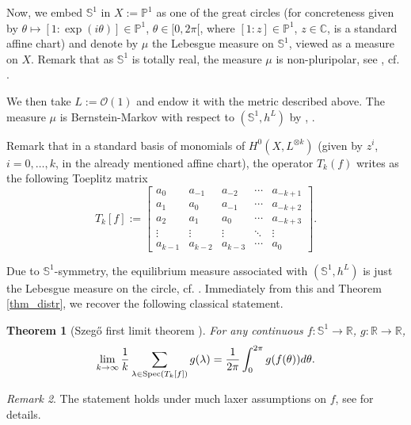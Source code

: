 \documentclass[12pt]{article}
\numberwithin{equation}{section}
\theoremstyle{theorem}
\newtheorem{thm}{Theorem}[section]
\theoremstyle{definition}
\theoremstyle{remark}
\newtheorem{rem}[thm]{Remark}
\newcommand{\comp}{\mathbb{C}}
\newcommand{\real}{\mathbb{R}}
\begin{document}
	Now, we embed $\mathbb{S}^1$ in $X := \mathbb{P}^1$ as one of the great circles (for concreteness given by $\theta \mapsto [1: \exp(i \theta)] \in \mathbb{P}^1$, $\theta \in [0, 2 \pi[$, where $[1 : z] \in \mathbb{P}^1$, $z \in \comp$, is a standard affine chart) and denote by $\mu$ the Lebesgue measure on $\mathbb{S}^1$, viewed as a measure on $X$.
	Remark that as $\mathbb{S}^1$ is totally real, the measure $\mu$ is non-pluripolar, see \cite{SadullaevReal}, cf. \cite[Exercise 4.39.5]{GuedjZeriahBook}. 
	\par 
	We then take $L := \mathscr{O}(1)$ and endow it with the metric described above.
	The measure $\mu$ is Bernstein-Markov with respect to $(\mathbb{S}^1, h^L)$ by \cite[Corollary 1.8]{BerBoucNys}, \cite[Proposition 3.6]{BernsteinMarkovSurvey}.
	\par 
	Remark that in a standard basis of monomials of $H^0(X, L^{\otimes k})$ (given by $z^i$, $i = 0, \ldots, k$, in the already mentioned affine chart), the operator $T_k(f)$ writes as the following Toeplitz matrix 
	\begin{equation}
		T_k[f]
		:=
		\begin{bmatrix}
		a_0 & a_{-1} & a_{-2} & \cdots & a_{-k + 1} \\
		a_1 & a_0 & a_{-1} & \cdots & a_{-k+2} \\
		a_2 & a_1 & a_0 & \cdots & a_{-k+3} \\
		\vdots & \vdots & \vdots & \ddots & \vdots \\
		a_{k - 1} & a_{k-2} & a_{k-3} & \cdots & a_0
		\end{bmatrix}.
	\end{equation}
	\par 
	Due to $\mathbb{S}^1$-symmetry, the equilibrium measure associated with $(\mathbb{S}^1, h^L)$ is just the Lebesgue measure on the circle, cf. \cite[Exercise 9.8]{GuedjZeriahBook}.
	Immediately from this and Theorem \ref{thm_distr}, we recover the following classical statement.
	\begin{thm}[{Szegő first limit theorem \cite{SzegoFST}}]
		For any continuous $f : \mathbb{S}^1 \to \real$, $g: \real \to \real$,
		\begin{equation}
			\lim_{k \to \infty} \frac{1}{k} \sum_{\lambda \in {\rm{Spec}} (T_k[f])} g(\lambda)
			=
			\frac{1}{2 \pi}
			\int_0^{2 \pi} g(f(\theta)) d \theta.
		\end{equation}
	\end{thm}
	\begin{rem}
		The statement holds under much laxer assumptions on $f$, see \cite{NikolskiBook} for details.
	\end{rem}
\end{document}
